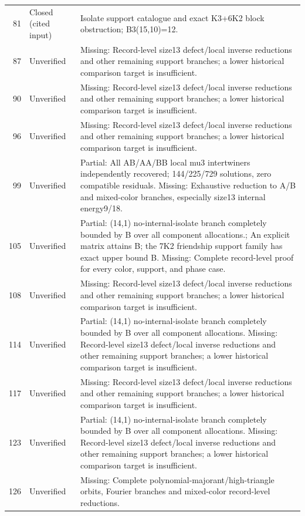 \begin{longtable}{@{}r p{31mm} p{102mm}@{}}
81 & Closed (cited input) & Isolate support catalogue and exact K3+6K2 block obstruction; B3(15,10)=12. \\
87 & Unverified & Missing: Record-level size13 defect/local inverse reductions and other remaining support branches; a lower historical comparison target is insufficient. \\
90 & Unverified & Missing: Record-level size13 defect/local inverse reductions and other remaining support branches; a lower historical comparison target is insufficient. \\
96 & Unverified & Missing: Record-level size13 defect/local inverse reductions and other remaining support branches; a lower historical comparison target is insufficient. \\
99 & Unverified & Partial: All AB/AA/BB local mu3 intertwiners independently recovered; 144/225/729 solutions, zero compatible residuals. Missing: Exhaustive reduction to A/B and mixed-color branches, especially size13 internal energy9/18. \\
105 & Unverified & Partial: (14,1) no-internal-isolate branch completely bounded by B over all component allocations.; An explicit matrix attains B; the 7K2 friendship support family has exact upper bound B. Missing: Complete record-level proof for every color, support, and phase case. \\
108 & Unverified & Missing: Record-level size13 defect/local inverse reductions and other remaining support branches; a lower historical comparison target is insufficient. \\
114 & Unverified & Partial: (14,1) no-internal-isolate branch completely bounded by B over all component allocations. Missing: Record-level size13 defect/local inverse reductions and other remaining support branches; a lower historical comparison target is insufficient. \\
117 & Unverified & Missing: Record-level size13 defect/local inverse reductions and other remaining support branches; a lower historical comparison target is insufficient. \\
123 & Unverified & Partial: (14,1) no-internal-isolate branch completely bounded by B over all component allocations. Missing: Record-level size13 defect/local inverse reductions and other remaining support branches; a lower historical comparison target is insufficient. \\
126 & Unverified & Missing: Complete polynomial-majorant/high-triangle orbits, Fourier branches and mixed-color record-level reductions. \\

\end{longtable}
